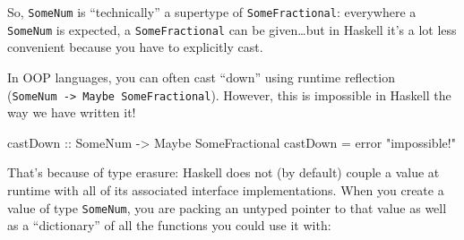 \documentclass[]{article}
\newenvironment{Shaded}{}{}
\newcommand{\DataTypeTok}[1]{\textcolor[rgb]{0.56,0.13,0.00}{#1}}
\newcommand{\FunctionTok}[1]{\textcolor[rgb]{0.02,0.16,0.49}{#1}}
\newcommand{\NormalTok}[1]{#1}
\newcommand{\OtherTok}[1]{\textcolor[rgb]{0.00,0.44,0.13}{#1}}
\newcommand{\StringTok}[1]{\textcolor[rgb]{0.25,0.44,0.63}{#1}}
\begin{document}
So, \texttt{SomeNum} is ``technically'' a supertype of \texttt{SomeFractional}:
everywhere a \texttt{SomeNum} is expected, a \texttt{SomeFractional} can be
given\ldots but in Haskell it's a lot less convenient because you have to
explicitly cast.

In OOP languages, you can often cast ``down'' using runtime reflection
(\texttt{SomeNum\ -\textgreater{}\ Maybe\ SomeFractional}). However, this is
impossible in Haskell the way we have written it!

\begin{Shaded}
\begin{Highlighting}[]
\OtherTok{castDown ::} \DataTypeTok{SomeNum} \OtherTok{{-}\textgreater{}} \DataTypeTok{Maybe} \DataTypeTok{SomeFractional}
\NormalTok{castDown }\OtherTok{=} \FunctionTok{error} \StringTok{"impossible!"}
\end{Highlighting}
\end{Shaded}

That's because of type erasure: Haskell does not (by default) couple a value at
runtime with all of its associated interface implementations. When you create a
value of type \texttt{SomeNum}, you are packing an untyped pointer to that value
as well as a ``dictionary'' of all the functions you could use it with:
\end{document}

